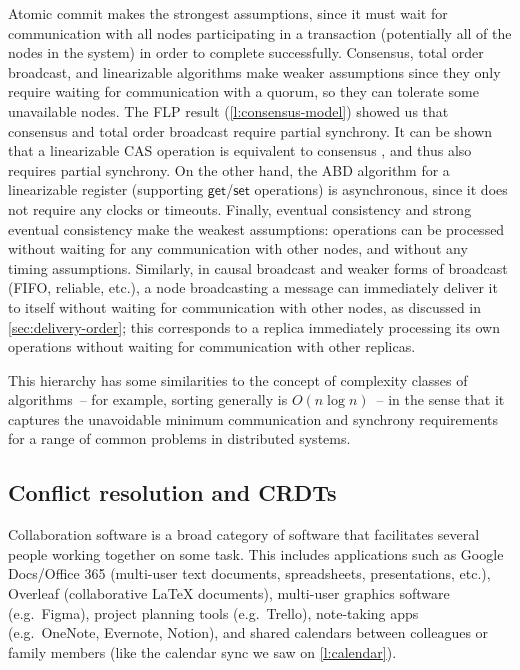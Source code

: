 Atomic commit makes the strongest assumptions, since it must wait for communication with all nodes participating in a transaction (potentially all of the nodes in the system) in order to complete successfully.
Consensus, total order broadcast, and linearizable algorithms make weaker assumptions since they only require waiting for communication with a quorum, so they can tolerate some unavailable nodes.
The FLP result (\autoref{l:consensus-model}) showed us that consensus and total order broadcast require partial synchrony.
It can be shown that a linearizable CAS operation is equivalent to consensus \citep{Herlihy:1991}, and thus also requires partial synchrony.
On the other hand, the ABD algorithm for a linearizable register (supporting $\mathsf{get}$/$\mathsf{set}$ operations) is asynchronous, since it does not require any clocks or timeouts.
Finally, eventual consistency and strong eventual consistency make the weakest assumptions: operations can be processed without waiting for any communication with other nodes, and without any timing assumptions.
Similarly, in causal broadcast and weaker forms of broadcast (FIFO, reliable, etc.), a node broadcasting a message can immediately deliver it to itself without waiting for communication with other nodes, as discussed in \autoref{sec:delivery-order}; this corresponds to a replica immediately processing its own operations without waiting for communication with other replicas.

This hierarchy has some similarities to the concept of complexity classes of algorithms~-- for example, sorting generally is $O(n \log n)$~-- in the sense that it captures the unavoidable minimum communication and synchrony requirements for a range of common problems in distributed systems.

\subsection{Conflict resolution and CRDTs}\label{sec:collaboration}

Collaboration software is a broad category of software that facilitates several people working together on some task.
This includes applications such as Google Docs/Office 365 (multi-user text documents, spreadsheets, presentations, etc.), Overleaf (collaborative {\LaTeX} documents), multi-user graphics software (e.g.\ Figma), project planning tools (e.g.\ Trello), note-taking apps (e.g.\ OneNote, Evernote, Notion), and shared calendars between colleagues or family members (like the calendar sync we saw on \autoref{l:calendar}).

